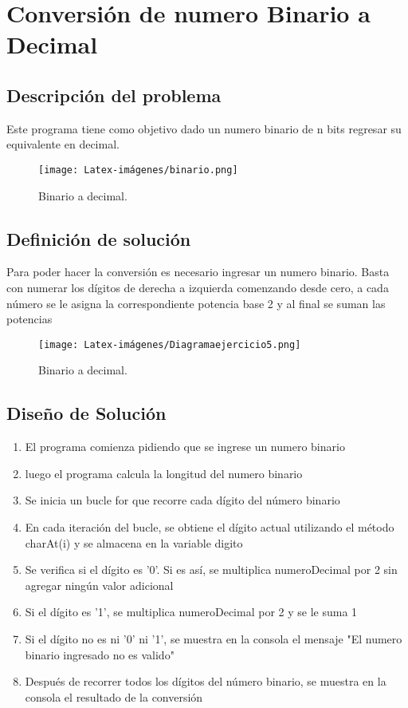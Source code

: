 \section{Conversión de numero Binario a Decimal}

\subsection{Descripción del problema}
Este programa tiene como objetivo dado un numero binario de n bits regresar su equivalente en decimal.

\begin {figure}[h!]
\centerline{\texttt{[image: Latex-imágenes/binario.png]}}
\caption{Binario a decimal.}
\label{fig}
\end {figure}


\subsection{Definición  de solución}
Para poder hacer la conversión es necesario ingresar un numero binario. Basta con numerar los dígitos de derecha a izquierda comenzando desde cero, a cada número se le asigna la correspondiente potencia base 2 y al final se suman las potencias\cite{articuloBinario} 

\begin {figure}[h!]
\centerline{\texttt{[image: Latex-imágenes/Diagramaejercicio5.png]}}
\caption{Binario a decimal.}
\label{fig}
\end {figure}



\subsection{Diseño de Solución}

\begin{enumerate}
  \item El programa comienza pidiendo que se ingrese un numero binario
  \item luego el programa calcula la longitud del numero binario
  \item Se inicia un bucle for que recorre cada dígito del número binario
  \item En cada iteración del bucle, se obtiene el dígito actual utilizando el método charAt(i) y se almacena en la variable digito
  \item Se verifica si el dígito es '0'. Si es así, se multiplica numeroDecimal por 2 sin agregar ningún valor adicional
  \item Si el dígito es '1', se multiplica numeroDecimal por 2 y se le suma 1
  \item Si el dígito no es ni '0' ni '1', se muestra en la consola el mensaje "El numero binario ingresado no es valido"
  \item Después de recorrer todos los dígitos del número binario, se muestra en la consola el resultado de la conversión
  
\end{enumerate}


